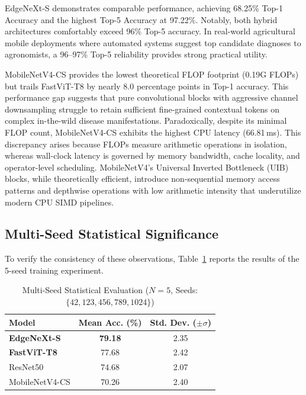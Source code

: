 \documentclass[conference]{IEEEtran}
\begin{document}
EdgeNeXt-S demonstrates comparable performance, achieving 68.25\% Top-1 Accuracy and the highest Top-5 Accuracy at 97.22\%. Notably, both hybrid architectures comfortably exceed 96\% Top-5 accuracy. In real-world agricultural mobile deployments where automated systems suggest top candidate diagnoses to agronomists, a 96--97\% Top-5 reliability provides strong practical utility.

MobileNetV4-CS provides the lowest theoretical FLOP footprint (0.19G FLOPs) but trails FastViT-T8 by nearly 8.0 percentage points in Top-1 accuracy. This performance gap suggests that pure convolutional blocks with aggressive channel downsampling struggle to retain sufficient fine-grained contextual tokens on complex in-the-wild disease manifestations. Paradoxically, despite its minimal FLOP count, MobileNetV4-CS exhibits the highest CPU latency (66.81\,ms). This discrepancy arises because FLOPs measure arithmetic operations in isolation, whereas wall-clock latency is governed by memory bandwidth, cache locality, and operator-level scheduling. MobileNetV4's Universal Inverted Bottleneck (UIB) blocks, while theoretically efficient, introduce non-sequential memory access patterns and depthwise operations with low arithmetic intensity that underutilize modern CPU SIMD pipelines.

\subsection{Multi-Seed Statistical Significance}
To verify the consistency of these observations, Table~\ref{tab:multiseed} reports the results of the 5-seed training experiment.

\begin{table}[htbp]
\caption{Multi-Seed Statistical Evaluation ($N=5$, Seeds: $\{42, 123, 456, 789, 1024\}$)}
\label{tab:multiseed}
\begin{center}
\begin{tabular}{lcc}
\toprule
\textbf{Model} & \textbf{Mean Acc. (\%)} & \textbf{Std. Dev. ($\pm\sigma$)} \\
\midrule
\textbf{EdgeNeXt-S} & \textbf{79.18} & 2.35 \\
\textbf{FastViT-T8} & 77.68 & 2.42 \\
ResNet50 & 74.68 & 2.07 \\
MobileNetV4-CS & 70.26 & 2.40 \\
\bottomrule
\end{tabular}
\end{center}
\end{table}
\end{document}

